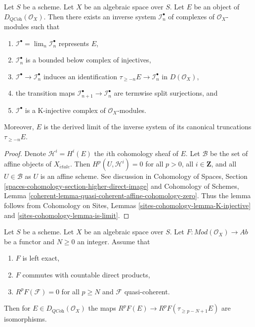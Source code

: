 \begin{lemma}
\label{lemma-nice-K-injective}
Let $S$ be a scheme. Let $X$ be an algebraic space over $S$. Let $E$ be an
object of $D_{\textit{QCoh}}(\mathcal{O}_X)$. Then there exists an inverse
system $\mathcal{I}_n^\bullet$ of complexes of $\mathcal{O}_X$-modules
such that
\begin{enumerate}
\item $\mathcal{I}^\bullet = \lim_n \mathcal{I}_n^\bullet$ represents $E$,
\item $\mathcal{I}_n^\bullet$ is a bounded below complex of injectives,
\item $\mathcal{I}^\bullet \to \mathcal{I}_n^\bullet$ induces an
identification $\tau_{\geq -n}E \to \mathcal{I}_n^\bullet$
in $D(\mathcal{O}_X)$,
\item the transition maps
$\mathcal{I}_{n + 1}^\bullet \to \mathcal{I}_n^\bullet$
are termwise split surjections, and
\item $\mathcal{I}^\bullet$ is a K-injective complex of
$\mathcal{O}_X$-modules.
\end{enumerate}
Moreover, $E$ is the derived limit of the inverse system of
its canonical truncations $\tau_{\geq -n}E$.
\end{lemma}

\begin{proof}
Denote $\mathcal{H}^i = H^i(E)$ the $i$th cohomology sheaf of $E$.
Let $\mathcal{B}$ be the set of affine objects of $X_{\acute{e}tale}$.
Then $H^p(U, \mathcal{H}^i) = 0$ for all $p > 0$, all $i \in \mathbf{Z}$,
and all $U \in \mathcal{B}$ as $U$ is an affine scheme.
See discussion in
Cohomology of Spaces, Section
\ref{spaces-cohomology-section-higher-direct-image}
and
Cohomology of Schemes, Lemma
\ref{coherent-lemma-quasi-coherent-affine-cohomology-zero}.
Thus the lemma follows from
Cohomology on Sites, Lemmas \ref{sites-cohomology-lemma-K-injective} and
\ref{sites-cohomology-lemma-is-limit}.
\end{proof}

\begin{lemma}
\label{lemma-application-nice-K-injective}
Let $S$ be a scheme. Let $X$ be an algebraic space over $S$.
Let $F : \textit{Mod}(\mathcal{O}_X) \to \textit{Ab}$
be a functor and $N \geq 0$ an integer. Assume that
\begin{enumerate}
\item $F$ is left exact,
\item $F$ commutes with countable direct products,
\item $R^pF(\mathcal{F}) = 0$ for all $p \geq N$ and $\mathcal{F}$
quasi-coherent.
\end{enumerate}
Then for $E \in D_{\textit{QCoh}}(\mathcal{O}_X)$ the maps
$R^pF(E) \to R^pF(\tau_{\geq p - N + 1}E)$ are isomorphisms.
\end{lemma}

